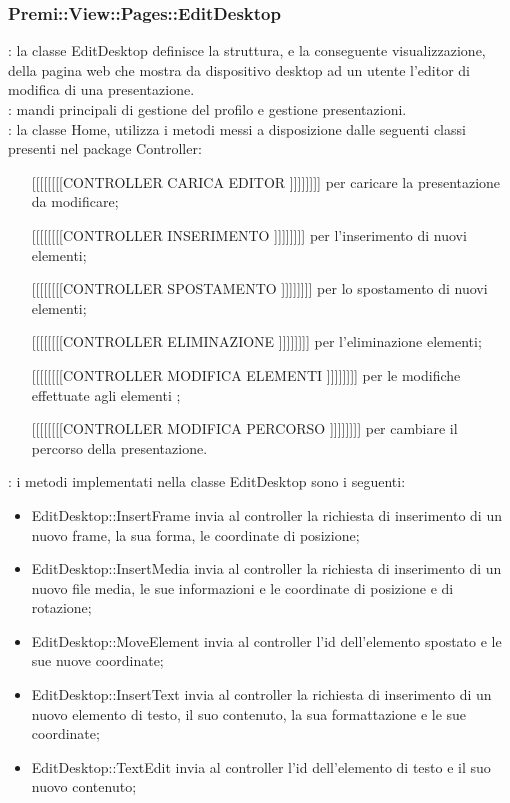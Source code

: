 {		\subsubsection{Premi::View::Pages::EditDesktop}{
			\textbf{\tipo}: la classe EditDesktop definisce la struttura, e la conseguente visualizzazione, della pagina web che mostra da dispositivo desktop ad un utente  l'editor di modifica di una presentazione.\\
			\textbf{\relaz}: mandi principali di gestione del profilo e gestione presentazioni.\\	
			\textbf{\relaz}: la classe Home, utilizza i metodi messi a disposizione dalle seguenti classi presenti nel package Controller:
			\begin{itemize}
				\item [[[[[[[[[CONTROLLER CARICA EDITOR]]]]]]]]] per caricare la presentazione da modificare;
				\item [[[[[[[[[CONTROLLER INSERIMENTO]]]]]]]]] per l'inserimento di nuovi elementi;
				\item [[[[[[[[[CONTROLLER SPOSTAMENTO]]]]]]]]] per lo spostamento di nuovi elementi;
				\item [[[[[[[[[CONTROLLER ELIMINAZIONE]]]]]]]]] per l'eliminazione elementi;
				\item [[[[[[[[[CONTROLLER MODIFICA ELEMENTI]]]]]]]]] per le modifiche  effettuate agli elementi ;
				\item [[[[[[[[[CONTROLLER MODIFICA PERCORSO]]]]]]]]] per cambiare il percorso della presentazione.
			\end{itemize}
			\textbf{\interfacce}: i metodi implementati nella classe EditDesktop sono i seguenti:
			\begin{itemize}
				\item EditDesktop::InsertFrame invia al controller la richiesta di inserimento di un nuovo frame, la sua forma, le coordinate di posizione;
				\item EditDesktop::InsertMedia invia al controller la richiesta di inserimento di un nuovo file media, le sue informazioni e le coordinate di posizione e di rotazione;
				\item EditDesktop::MoveElement invia al controller l'id dell'elemento spostato e le sue nuove coordinate;
				\item EditDesktop::InsertText invia al controller la richiesta di inserimento di un nuovo elemento di testo, il suo contenuto, la sua formattazione e le sue coordinate;
				\item EditDesktop::TextEdit invia al controller l'id dell'elemento di testo e il suo nuovo contenuto;

\end{itemize}}}
